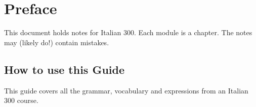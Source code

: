 
\chapter{Preface}
This document holds notes for Italian 300. Each module is a chapter. 
The notes may (likely do!) contain mistakes.

\section{How to use this Guide}
\label{how-to-use-this-guide}

This guide covers all the grammar, vocabulary and expressions from an
Italian 300 course. 

